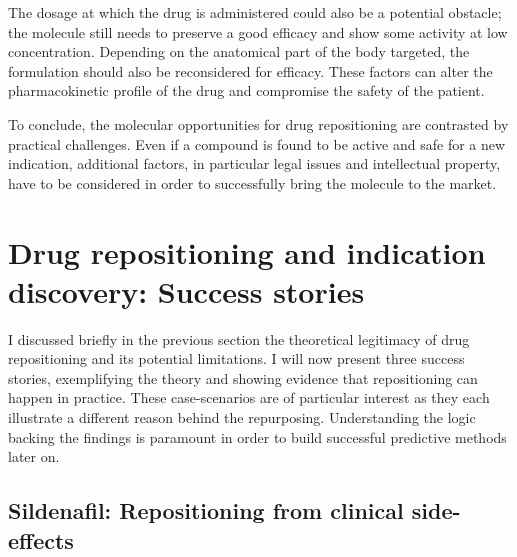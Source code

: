 The dosage at which the drug is administered could also be a potential obstacle; the molecule still needs to preserve a good efficacy and show some activity at low concentration. Depending on the anatomical part of the body targeted, the formulation should also be reconsidered for efficacy. These factors can alter the pharmacokinetic profile of the drug and compromise the safety of the patient.

To conclude, the molecular opportunities for drug repositioning are contrasted by practical challenges. Even if a compound is found to be active and safe for a new indication, additional factors, in particular legal issues and intellectual property, have to be considered in order to successfully bring the molecule to the market.

\section{Drug repositioning and indication discovery: Success stories}

I discussed briefly in the previous section the theoretical legitimacy of drug repositioning and its potential limitations. I will now present three success stories, exemplifying the theory and showing evidence that repositioning can happen in practice. These case-scenarios are of particular interest as they each illustrate a different reason behind the repurposing. Understanding the logic backing the findings is paramount in order to build successful predictive methods later on.

\subsection{Sildenafil: Repositioning from clinical side-effects}

